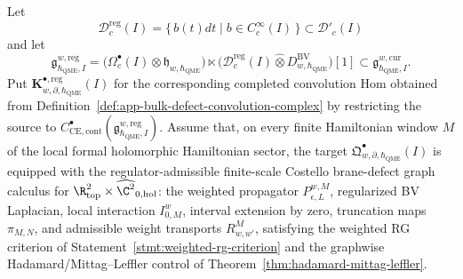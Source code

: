 \begin{prop}
\label{prop:app-regular-density-costello-graph-kernel}
  Let
  \[
    \mathcal D^{\mathrm{reg}}_c(I)
      =\{\,b(t)dt\mid b\in C^\infty_c(I)\,\}
      \subset \mathcal D'_c(I)
  \]
  and let
  \[
    \mathfrak g^{w,\mathrm{reg}}_{\hbar_{\mathrm{QME}},I}
      =
      \bigl(\Omega^\bullet_c(I)\widehat\otimes
      \mathfrak h_{w,\hbar_{\mathrm{QME}}}\bigr)
      \ltimes
      \bigl(\mathcal D^{\mathrm{reg}}_c(I)\widehat\otimes
      D^{\mathrm{BV}}_{w,\hbar_{\mathrm{QME}}}\bigr)[1]
      \subset
      \mathfrak g^{w,\mathrm{cur}}_{\hbar_{\mathrm{QME}},I}.
  \]
  Put \(\mathbf K^{\bullet,\mathrm{reg}}_{w,\partial,\hbar_{\mathrm{QME}}}(I)\) for the
  corresponding completed convolution Hom obtained from
  Definition~\ref{def:app-bulk-defect-convolution-complex} by restricting
  the source to
  \(C^\bullet_{\mathrm{CE},\mathrm{cont}}
  (\mathfrak g^{w,\mathrm{reg}}_{\hbar_{\mathrm{QME}},I})\).
  Assume that, on every finite Hamiltonian window \(M\) of the local
  formal holomorphic Hamiltonian sector, the target
  \(\mathfrak Q^\bullet_{w,\partial,\hbar_{\mathrm{QME}}}(I)\) is equipped with the
  regulator-admissible finite-scale Costello brane-defect graph calculus
  for
  \(\R^2_{\mathrm{top}}\times\widehat{\C^2}_{0,\mathrm{hol}}\):
  the weighted propagator \(P_{\epsilon,L}^{w,M}\), regularized BV
  Laplacian, local interaction \(I_{0,M}^{w}\), interval extension by
  zero, truncation maps \(\pi_{M,N}\), and admissible weight transports
  \(R^M_{w,w'}\), satisfying the weighted RG criterion of
  Statement~\ref{stmt:weighted-rg-criterion} and the graphwise
  Hadamard/Mittag--Leffler control of
  Theorem~\ref{thm:hadamard-mittag-leffler}.


\end{prop}
